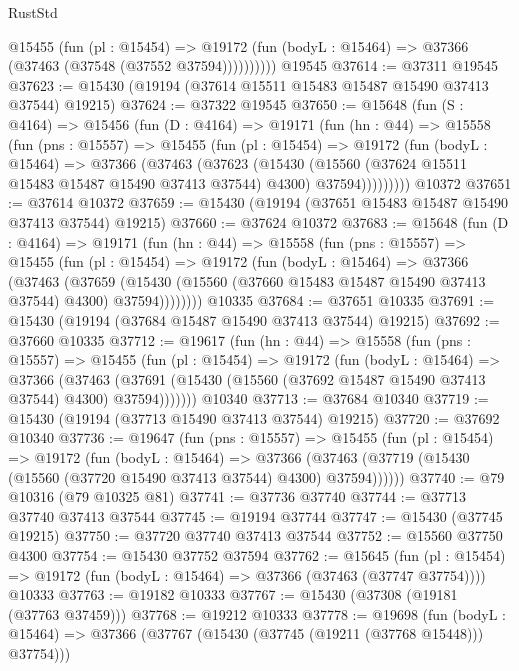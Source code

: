 \begin{lexlean}{RustStd}
\begin{coremodule}
            @15455
              (fun (pl : @15454) =>
              @19172 (fun (bodyL : @15464) => @37366 (@37463 (@37548 (@37552 @37594))))))))))
    @19545
@37614 := @37311 @19545
@37623 := @15430 (@19194 (@37614 @15511 @15483 @15487 @15490 @37413 @37544) @19215)
@37624 := @37322 @19545
@37650 := @15648
    (fun (S : @4164) =>
    @15456
      (fun (D : @4164) =>
      @19171
        (fun (hn : @44) =>
        @15558
          (fun (pns : @15557) =>
          @15455
            (fun (pl : @15454) =>
            @19172
              (fun (bodyL : @15464) =>
              @37366
                (@37463
                  (@37623
                    (@15430
                      (@15560 (@37624 @15511 @15483 @15487 @15490 @37413 @37544) @4300)
                      @37594)))))))))
    @10372
@37651 := @37614 @10372
@37659 := @15430 (@19194 (@37651 @15483 @15487 @15490 @37413 @37544) @19215)
@37660 := @37624 @10372
@37683 := @15648
    (fun (D : @4164) =>
    @19171
      (fun (hn : @44) =>
      @15558
        (fun (pns : @15557) =>
        @15455
          (fun (pl : @15454) =>
          @19172
            (fun (bodyL : @15464) =>
            @37366
              (@37463
                (@37659
                  (@15430 (@15560 (@37660 @15483 @15487 @15490 @37413 @37544) @4300) @37594))))))))
    @10335
@37684 := @37651 @10335
@37691 := @15430 (@19194 (@37684 @15487 @15490 @37413 @37544) @19215)
@37692 := @37660 @10335
@37712 := @19617
    (fun (hn : @44) =>
    @15558
      (fun (pns : @15557) =>
      @15455
        (fun (pl : @15454) =>
        @19172
          (fun (bodyL : @15464) =>
          @37366
            (@37463
              (@37691 (@15430 (@15560 (@37692 @15487 @15490 @37413 @37544) @4300) @37594)))))))
    @10340
@37713 := @37684 @10340
@37719 := @15430 (@19194 (@37713 @15490 @37413 @37544) @19215)
@37720 := @37692 @10340
@37736 := @19647
    (fun (pns : @15557) =>
    @15455
      (fun (pl : @15454) =>
      @19172
        (fun (bodyL : @15464) =>
        @37366 (@37463 (@37719 (@15430 (@15560 (@37720 @15490 @37413 @37544) @4300) @37594))))))
@37740 := @79 @10316 (@79 @10325 @81)
@37741 := @37736 @37740
@37744 := @37713 @37740 @37413 @37544
@37745 := @19194 @37744
@37747 := @15430 (@37745 @19215)
@37750 := @37720 @37740 @37413 @37544
@37752 := @15560 @37750 @4300
@37754 := @15430 @37752 @37594
@37762 := @15645
    (fun (pl : @15454) => @19172 (fun (bodyL : @15464) => @37366 (@37463 (@37747 @37754))))
    @10333
@37763 := @19182 @10333
@37767 := @15430 (@37308 (@19181 (@37763 @37459)))
@37768 := @19212 @10333
@37778 := @19698
    (fun (bodyL : @15464) => @37366 (@37767 (@15430 (@37745 (@19211 (@37768 @15448))) @37754)))

\end{coremodule}
\end{lexlean}
